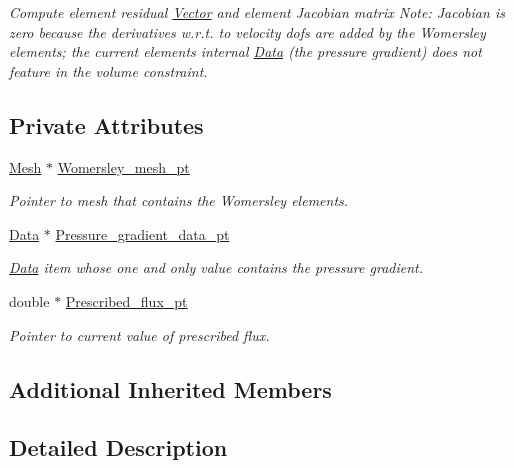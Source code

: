 \begin{DoxyCompactItemize}
\begin{DoxyCompactList}\small\item\em Compute element residual \hyperlink{classoomph_1_1Vector}{Vector} and element Jacobian matrix Note\+: Jacobian is zero because the derivatives w.\+r.\+t. to velocity dofs are added by the Womersley elements; the current element\textquotesingle{}s internal \hyperlink{classoomph_1_1Data}{Data} (the pressure gradient) does not feature in the volume constraint. \end{DoxyCompactList}\end{DoxyCompactItemize}
\subsection*{Private Attributes}
\begin{DoxyCompactItemize}
\item 
\hyperlink{classoomph_1_1Mesh}{Mesh} $\ast$ \hyperlink{classoomph_1_1ImposeFluxForWomersleyElement_aa6b7bb4b9d527576ca8ee16918d0cbb4}{Womersley\+\_\+mesh\+\_\+pt}
\begin{DoxyCompactList}\small\item\em Pointer to mesh that contains the Womersley elements. \end{DoxyCompactList}\item 
\hyperlink{classoomph_1_1Data}{Data} $\ast$ \hyperlink{classoomph_1_1ImposeFluxForWomersleyElement_a4c8079994c71ce43a36645c2b2dc4580}{Pressure\+\_\+gradient\+\_\+data\+\_\+pt}
\begin{DoxyCompactList}\small\item\em \hyperlink{classoomph_1_1Data}{Data} item whose one and only value contains the pressure gradient. \end{DoxyCompactList}\item 
double $\ast$ \hyperlink{classoomph_1_1ImposeFluxForWomersleyElement_a40cd4288395b34cd199080c136da4d7b}{Prescribed\+\_\+flux\+\_\+pt}
\begin{DoxyCompactList}\small\item\em Pointer to current value of prescribed flux. \end{DoxyCompactList}\end{DoxyCompactItemize}
\subsection*{Additional Inherited Members}


\subsection{Detailed Description}
